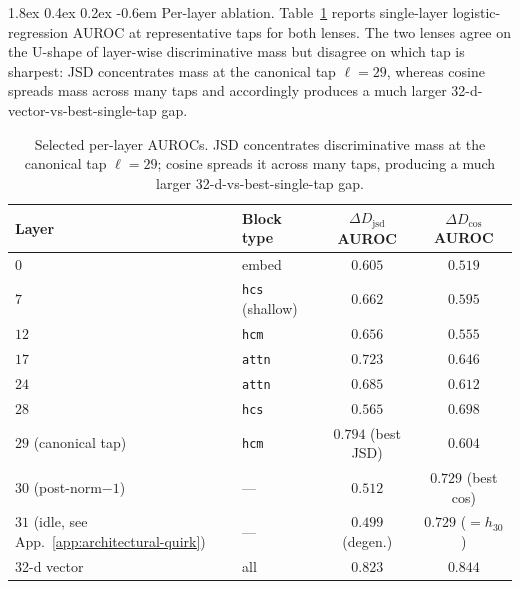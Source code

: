 \documentclass{article}
\makeatletter
\renewcommand\paragraph{\@startsection{paragraph}{4}{\z@}%
  {1.8ex \@plus 0.4ex \@minus 0.2ex}%
  {-0.6em}%
{\normalfont\normalsize\bfseries}}
\theoremstyle{plain}
\theoremstyle{definition}
\theoremstyle{remark}
\newcommand{\DDcos}{\Delta D_{\cos}}
\newcommand{\DDjsd}{\Delta D_{\mathrm{jsd}}}
\makeatother
\begin{document}
\paragraph{Per-layer ablation.} Table~\ref{tab:per-layer} reports
single-layer logistic-regression AUROC at representative taps for both
lenses. The two lenses agree on the U-shape of layer-wise discriminative
mass but disagree on which tap is sharpest: JSD concentrates mass at the
canonical tap $\ell\!=\!29$, whereas cosine spreads mass across many
taps and accordingly produces a much larger 32-d-vector-vs-best-single-tap
gap.

\begin{table}[!htbp]
  \caption{Selected per-layer AUROCs. JSD concentrates discriminative
    mass at the canonical tap $\ell\!=\!29$; cosine spreads it across many
  taps, producing a much larger 32-d-vs-best-single-tap gap.}
  \label{tab:per-layer}
  \centering
  \small
  \begin{tabular}{@{}llcc@{}}
    \toprule
    Layer & Block type & $\DDjsd$ AUROC & $\DDcos$ AUROC \\
    \midrule
    $0$  & embed                    & $0.605$ & $0.519$ \\
    $7$  & \texttt{hcs} (shallow)   & $0.662$ & $0.595$ \\
    $12$ & \texttt{hcm}             & $0.656$ & $0.555$ \\
    $17$ & \texttt{attn}            & $0.723$ & $0.646$ \\
    $24$ & \texttt{attn}            & $0.685$ & $0.612$ \\
    $28$ & \texttt{hcs}             & $0.565$ & $0.698$ \\
    $29$ (canonical tap) & \texttt{hcm}
    & $\mathbf{0.794}$ (best JSD) & $0.604$ \\
    $30$ (post-norm$-1$)  & ---     & $0.512$ & $\mathbf{0.729}$ (best cos) \\
    $31$ (idle, see App.~\ref{app:architectural-quirk}) & ---
    & $0.499$ (degen.) & $0.729$ ($=h_{30}$) \\
    \midrule
    32-d vector & all                 & $0.823$ & $0.844$ \\
    \bottomrule
  \end{tabular}
\end{table}
\end{document}
